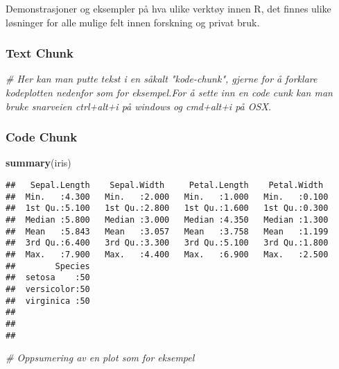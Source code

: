 \documentclass[
  norsk,
]{article}
\newenvironment{Shaded}{\begin{snugshade}}{\end{snugshade}}
\newcommand{\CommentTok}[1]{\textcolor[rgb]{0.56,0.35,0.01}{\textit{#1}}}
\newcommand{\KeywordTok}[1]{\textcolor[rgb]{0.13,0.29,0.53}{\textbf{#1}}}
\newcommand{\NormalTok}[1]{#1}
\begin{document}
Demonstrasjoner og eksempler på hva ulike verktøy innen R, det finnes
ulike løsninger for alle mulige felt innen forskning og privat bruk.

\hypertarget{text-chunk}{%
\subsubsection{Text Chunk}\label{text-chunk}}

\begin{Shaded}
\begin{Highlighting}[]
\CommentTok{# Her kan man putte tekst i en såkalt "kode-chunk", gjerne for å forklare kodeplotten nedenfor som for eksempel.For å sette inn en code cunk kan man bruke snarveien ctrl+alt+i på windows og cmd+alt+i på OSX.}
\end{Highlighting}
\end{Shaded}

\hypertarget{code-chunk}{%
\subsubsection{Code Chunk}\label{code-chunk}}

\begin{Shaded}
\begin{Highlighting}[]
\KeywordTok{summary}\NormalTok{(iris)}
\end{Highlighting}
\end{Shaded}

\begin{verbatim}
##   Sepal.Length    Sepal.Width     Petal.Length    Petal.Width   
##  Min.   :4.300   Min.   :2.000   Min.   :1.000   Min.   :0.100  
##  1st Qu.:5.100   1st Qu.:2.800   1st Qu.:1.600   1st Qu.:0.300  
##  Median :5.800   Median :3.000   Median :4.350   Median :1.300  
##  Mean   :5.843   Mean   :3.057   Mean   :3.758   Mean   :1.199  
##  3rd Qu.:6.400   3rd Qu.:3.300   3rd Qu.:5.100   3rd Qu.:1.800  
##  Max.   :7.900   Max.   :4.400   Max.   :6.900   Max.   :2.500  
##        Species  
##  setosa    :50  
##  versicolor:50  
##  virginica :50  
##                 
##                 
## 
\end{verbatim}

\begin{Shaded}
\begin{Highlighting}[]
\CommentTok{# Oppsumering av en plot som for eksempel}
\end{Highlighting}
\end{Shaded}
\end{document}
